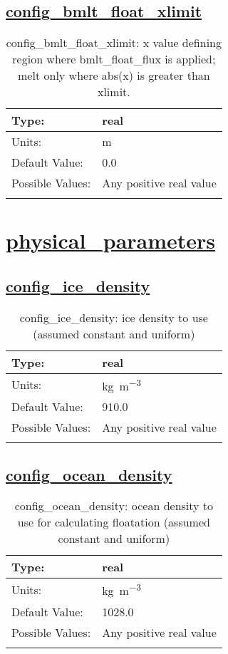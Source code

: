 \subsection[config\_bmlt\_float\_xlimit]{\hyperref[sec:nm_tab_thermal_solver]{config\_bmlt\_float\_xlimit}}
\label{subsec:nm_sec_config_bmlt_float_xlimit}
\begin{center}
\begin{longtable}{| p{2.0in} || p{4.0in} |}
    \hline
    Type: & real \\
    \hline
    Units: & \si{m} \\
    \hline
    Default Value: & 0.0 \\
    \hline
    Possible Values: & Any positive real value \\
    \hline
    \caption{config\_bmlt\_float\_xlimit: x value defining region where bmlt\_float\_flux is applied; melt only where abs(x) is greater than xlimit.}
\end{longtable}
\end{center}
\section[physical\_parameters]{\hyperref[sec:nm_tab_physical_parameters]{physical\_parameters}}
\label{sec:nm_sec_physical_parameters}
\subsection[config\_ice\_density]{\hyperref[sec:nm_tab_physical_parameters]{config\_ice\_density}}
\label{subsec:nm_sec_config_ice_density}
\begin{center}
\begin{longtable}{| p{2.0in} || p{4.0in} |}
    \hline
    Type: & real \\
    \hline
    Units: & \si{kg.m^{-3}} \\
    \hline
    Default Value: & 910.0 \\
    \hline
    Possible Values: & Any positive real value \\
    \hline
    \caption{config\_ice\_density: ice density to use (assumed constant and uniform)}
\end{longtable}
\end{center}
\subsection[config\_ocean\_density]{\hyperref[sec:nm_tab_physical_parameters]{config\_ocean\_density}}
\label{subsec:nm_sec_config_ocean_density}
\begin{center}
\begin{longtable}{| p{2.0in} || p{4.0in} |}
    \hline
    Type: & real \\
    \hline
    Units: & \si{kg.m^{-3}} \\
    \hline
    Default Value: & 1028.0 \\
    \hline
    Possible Values: & Any positive real value \\
    \hline
    \caption{config\_ocean\_density: ocean density to use for calculating floatation (assumed constant and uniform)}
\end{longtable}
\end{center}
